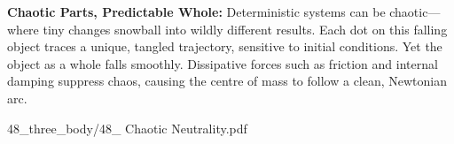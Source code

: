 \begin{SideNotePage}{
  \textbf{Chaotic Parts, Predictable Whole:}  
  Deterministic systems can be chaotic—where tiny changes snowball into wildly different results. Each dot on this falling object traces a unique, tangled trajectory, sensitive to initial conditions. Yet the object as a whole falls smoothly. Dissipative forces such as friction and internal damping suppress chaos, causing the centre of mass to follow a clean, Newtonian arc. \par
}{48_three_body/48_ Chaotic Neutrality.pdf}
\end{SideNotePage}
